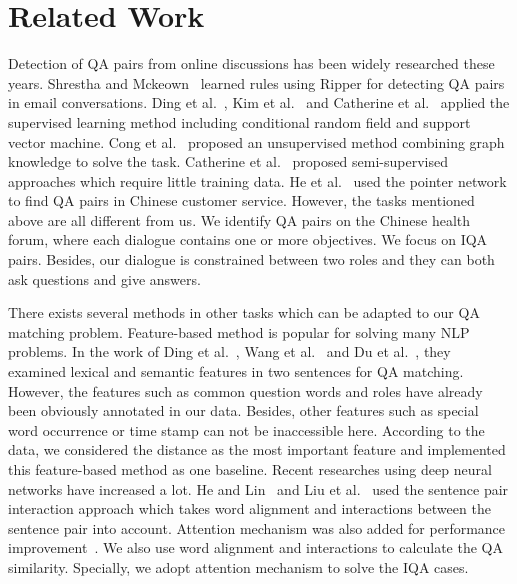 \section{Related Work}
\label{sec:relatedwork}


 
Detection of QA pairs from online discussions has been widely researched these years. Shrestha and Mckeown~ learned rules using Ripper for detecting QA pairs in email conversations. Ding et al.~, Kim et al.~ and Catherine et al.~ applied the supervised learning method including conditional random field and support vector machine. Cong et al.~ proposed an unsupervised method combining graph knowledge to solve the task. Catherine et al.~ proposed semi-supervised approaches which require little training data. He et al.~ used the pointer network to find QA pairs in Chinese customer service. However, the tasks mentioned above are all different from us. We identify QA pairs on the Chinese health forum, where each dialogue contains one or more objectives. We focus on IQA pairs. Besides, our dialogue is constrained between two roles and they can both ask questions and give answers.


There exists several methods in other tasks which can be adapted to our QA matching problem. Feature-based method is popular for solving many NLP problems. In the work of Ding et al.~, Wang et al.~ and Du et al.~, they examined lexical and semantic features in two sentences for QA matching. However, the features such as common question words and roles have already been obviously annotated in our data. Besides, other features such as special word occurrence or time stamp can not be inaccessible here. According to the data, we considered the distance as the most important feature and implemented this feature-based method as one baseline. Recent researches using deep neural networks have increased a lot. He and Lin~ and Liu et al.~ used the sentence pair interaction approach which takes word alignment and interactions between the sentence pair into account. Attention mechanism was also added for performance improvement~\cite{rocktaschel2015reasoning,wang2015learning,chen2016enhanced}. We also use word alignment and interactions to calculate the QA similarity. Specially, we adopt attention mechanism to solve the IQA cases.


